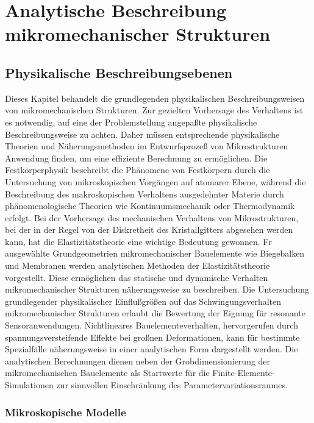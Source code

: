 \chapter[Analytische Beschreibung]
 {Analytische Beschreibung mikromechanischer Strukturen}
\label{beschreibungmikromechanischerstrukturen}


\section{Physikalische Beschreibungsebenen}
\label{beschreibungsebenen}

Dieses Kapitel behandelt die grundlegenden physikalischen
Beschreibungsweisen von mikromechanischen Strukturen. Zur gezielten
Vorhersage des Verhaltens ist es notwendig, auf eine der
Problemstellung angepaßte physikalische Beschreibungsweise zu achten.
Daher müssen entsprechende physikalische Theorien und Näherungsmethoden
im Entwurfsprozeß von Mikrostrukturen Anwendung finden, um eine
effiziente Berechnung zu ermöglichen. Die Festkörperphysik beschreibt
die Phänomene von Festkörpern durch die Untersuchung von mikroskopischen
Vorgängen auf atomarer Ebene, während die Beschreibung des makroskopischen
Verhaltens ausgedehnter Materie durch phänomenologische Theorien
wie Kontinuumsmechanik oder Thermodynamik erfolgt. Bei der Vorhersage des
mechanischen Verhaltens von Mikrostrukturen, bei der in der Regel von der
Diskretheit des Kristallgitters abgesehen werden kann, hat die
Elastizitätstheorie eine wichtige Bedeutung gewonnen.
Fr ausgewählte Grundgeometrien mikromechanischer Bauelemente wie
Biegebalken und Membranen werden analytischen Methoden der
Elastizitätstheorie vorgestellt. Diese ermöglichen das statische und
dynamische Verhalten mikromechanischer Strukturen näherungsweise zu beschreiben.
Die Untersuchung grundlegender physikalischer
Einflußgrößen auf das Schwingungsverhalten mikromechanischer
Strukturen erlaubt die Bewertung der Eignung für resonante
Sensoranwendungen. Nichtlineares Bauelementeverhalten, hervorgerufen
durch spannungsversteifende Effekte bei großnen Deformationen, kann für
bestimmte Spezialfälle näherungsweise in einer analytischen Form
dargestellt werden. Die analytischen Berechnungen dienen neben der
Grobdimensionierung der mikromechanischen Bauelemente als Startwerte
für die Finite-Elemente-Simulationen zur sinnvollen Einschränkung des
Parametervariationsraumes.



\subsection{Mikroskopische Modelle}
\label{mikroskopischemodelle}

